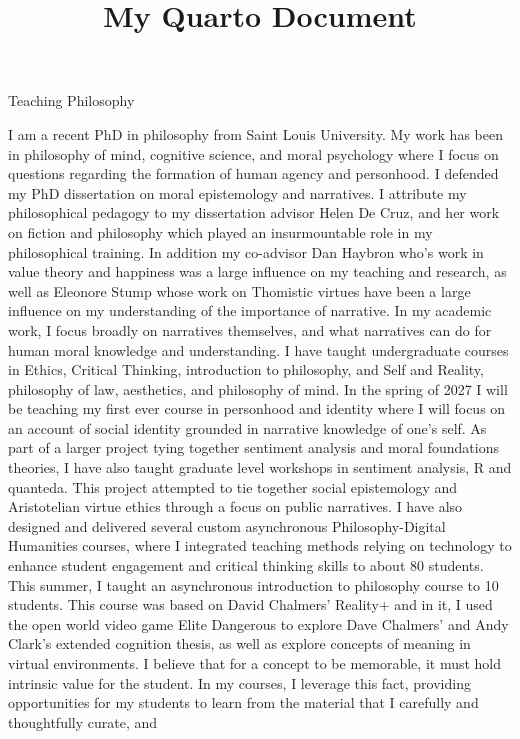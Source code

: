 \documentclass[
  letterpaper,
  DIV=11,
  numbers=noendperiod]{scrartcl}
\title{My Quarto Document}
\author{}
\date{}
\begin{document}
\maketitle


Teaching Philosophy

I am a recent PhD in philosophy from Saint Louis University. My work has
been in philosophy of mind, cognitive science, and moral psychology
where I focus on questions regarding the formation of human agency and
personhood. I defended my PhD dissertation on moral epistemology and
narratives. I attribute my philosophical pedagogy to my dissertation
advisor Helen De Cruz, and her work on fiction and philosophy which
played an insurmountable role in my philosophical training. In addition
my co-advisor Dan Haybron who's work in value theory and happiness was a
large influence on my teaching and research, as well as Eleonore Stump
whose work on Thomistic virtues have been a large influence on my
understanding of the importance of narrative. In my academic work, I
focus broadly on narratives themselves, and what narratives can do for
human moral knowledge and understanding. I have taught undergraduate
courses in Ethics, Critical Thinking, introduction to philosophy, and
Self and Reality, philosophy of law, aesthetics, and philosophy of mind.
In the spring of 2027 I will be teaching my first ever course in
personhood and identity where I will focus on an account of social
identity grounded in narrative knowledge of one's self. As part of a
larger project tying together sentiment analysis and moral foundations
theories, I have also taught graduate level workshops in sentiment
analysis, R and quanteda. This project attempted to tie together social
epistemology and Aristotelian virtue ethics through a focus on public
narratives. I have also designed and delivered several custom
asynchronous Philosophy-Digital Humanities courses, where I integrated
teaching methods relying on technology to enhance student engagement and
critical thinking skills to about 80 students. This summer, I taught an
asynchronous introduction to philosophy course to 10 students. This
course was based on David Chalmers' Reality+ and in it, I used the open
world video game Elite Dangerous to explore Dave Chalmers' and Andy
Clark's extended cognition thesis, as well as explore concepts of
meaning in virtual environments. I believe that for a concept to be
memorable, it must hold intrinsic value for the student. In my courses,
I leverage this fact, providing opportunities for my students to learn
from the material that I carefully and thoughtfully curate, and
\end{document}
